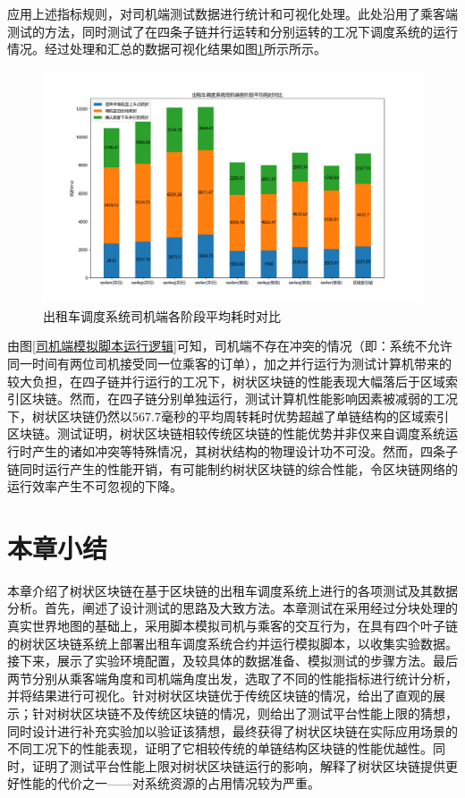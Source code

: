 应用上述指标规则，对司机端测试数据进行统计和可视化处理。此处沿用了乘客端测试的方法，同时测试了在四条子链并行运转和分别运转的工况下调度系统的运行情况。经过处理和汇总的数据可视化结果如图\ref{司机端平均耗时对比}所示所示。

\begin{figure}[htbp]
    \centering
    \includegraphics[width=\textwidth]{images/司机端测试.png}
    \caption{出租车调度系统司机端各阶段平均耗时对比}\label{司机端平均耗时对比} %
\end{figure}

由图\ref{司机端模拟脚本运行逻辑}可知，司机端不存在冲突的情况（即：系统不允许同一时间有两位司机接受同一位乘客的订单），加之并行运行为测试计算机带来的较大负担，在四子链并行运行的工况下，树状区块链的性能表现大幅落后于区域索引区块链。然而，在四子链分别单独运行，测试计算机性能影响因素被减弱的工况下，树状区块链仍然以567.7毫秒的平均周转耗时优势超越了单链结构的区域索引区块链。测试证明，树状区块链相较传统区块链的性能优势并非仅来自调度系统运行时产生的诸如冲突等特殊情况，其树状结构的物理设计功不可没。然而，四条子链同时运行产生的性能开销，有可能制约树状区块链的综合性能，令区块链网络的运行效率产生不可忽视的下降。

\section{本章小结}

本章介绍了树状区块链在基于区块链的出租车调度系统上进行的各项测试及其数据分析。首先，阐述了设计测试的思路及大致方法。本章测试在采用经过分块处理的真实世界地图的基础上，采用脚本模拟司机与乘客的交互行为，在具有四个叶子链的树状区块链系统上部署出租车调度系统合约并运行模拟脚本，以收集实验数据。接下来，展示了实验环境配置，及较具体的数据准备、模拟测试的步骤方法。最后两节分别从乘客端角度和司机端角度出发，选取了不同的性能指标进行统计分析，并将结果进行可视化。针对树状区块链优于传统区块链的情况，给出了直观的展示；针对树状区块链不及传统区块链的情况，则给出了测试平台性能上限的猜想，同时设计进行补充实验加以验证该猜想，最终获得了树状区块链在实际应用场景的不同工况下的性能表现，证明了它相较传统的单链结构区块链的性能优越性。同时，证明了测试平台性能上限对树状区块链运行的影响，解释了树状区块链提供更好性能的代价之一——对系统资源的占用情况较为严重。
